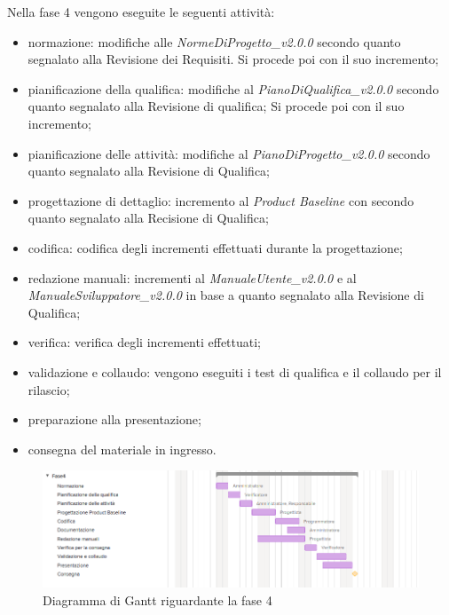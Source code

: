 Nella fase 4 vengono eseguite le seguenti attività:
\begin{itemize}
	\item normazione: modifiche alle \textit{NormeDiProgetto\_v2.0.0} secondo quanto segnalato alla Revisione dei Requisiti. Si procede poi con il suo incremento;
	\item pianificazione della qualifica: modifiche al \textit{PianoDiQualifica\_v2.0.0} secondo quanto segnalato alla Revisione di qualifica; Si procede poi con il suo incremento;
	\item pianificazione delle attività: modifiche al \textit{PianoDiProgetto\_v2.0.0} secondo quanto segnalato alla Revisione di Qualifica;
	\item progettazione di dettaglio: incremento al \textit{Product Baseline} con secondo quanto segnalato alla Recisione di Qualifica;
	\item codifica: codifica degli incrementi effettuati durante la progettazione;
	\item redazione manuali: incrementi al \textit{ManualeUtente\_v2.0.0} e al \textit{ManualeSviluppatore\_v2.0.0} in base a quanto segnalato alla Revisione di Qualifica;
	\item verifica: verifica degli incrementi effettuati;
	\item validazione e collaudo: vengono eseguiti i test di qualifica e il collaudo per il rilascio;
	\item preparazione alla presentazione;
	\item consegna del materiale in ingresso.
\end{itemize}

\begin{figure}[h]
	\centering
	\includegraphics[scale=0.70]{images/fase4.png}
	\caption{Diagramma di Gantt riguardante la fase 4}
\end{figure}